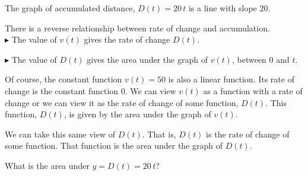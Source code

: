 \documentclass{ximera}
\begin{document}
The graph of accumulated distance, $D(t) = 20 \, t$ is a line with slope $20$.




\begin{image}
\end{image}
There is a reverse relationship between rate of change and accumulation. \\


$\blacktriangleright$ The value of $v(t)$ gives the rate of change $D(t)$.


$\blacktriangleright$ The value of $D(t)$ gives the area under the graph of $v(t)$, between $0$ and $t$.






Of course, the constant function $v(t) = 50$ is also a linear function. Its rate of change is the constant function $0$.  We can view $v(t)$ as a function with a rate of change or we can view it as the rate of change of some function, $D(t)$. This function, $D(t)$, is given by the area under the graph of $v(t)$.



We can take this same view of $D(t)$.  That is, $D(t)$ is the rate of change of some function.  That function is the area under the graph of $D(t)$.


What is the area under $y = D(t) = 20 \, t$?
\end{document}
